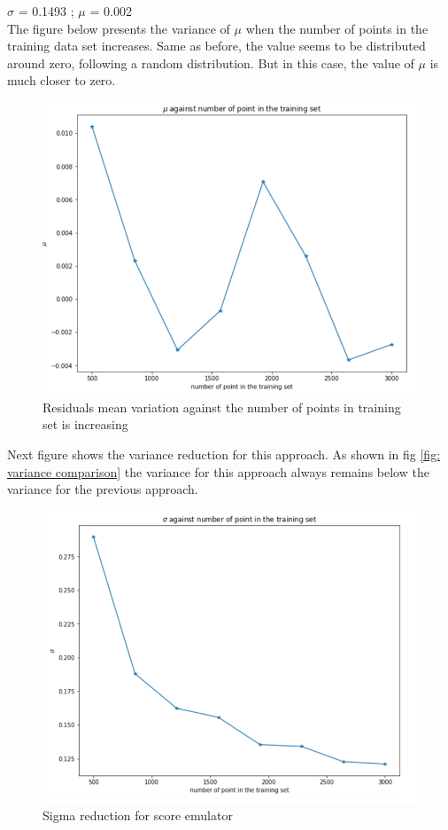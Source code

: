 \documentclass{article}
\begin{document}
$\sigma$ = 0.1493 ;
$\mu$ = 0.002 \\

The figure below presents the variance of $\mu$ when the number of points in the training data set increases. Same as before, the value seems to be distributed around zero, following a random distribution. But in this case, the value of $\mu$ is much closer to zero.

\begin{figure}[H]
\centering
\includegraphics[scale=0.6]{image/mu_variation_score.png}
\caption{Residuals mean variation against the number of points in training set is increasing}
\label{fig: scrore mean variation}
\end{figure}

Next figure shows the variance reduction for this approach. As shown in fig \ref{fig: variance comparison} the variance for this approach always remains below the variance for the previous approach.   

\begin{figure}[H]
\centering
\includegraphics[scale=0.6]{image/sigma_reduction_score.png}
\caption{Sigma reduction for score emulator}
\label{fig: scrore mean variation}
\end{figure}
\end{document}

